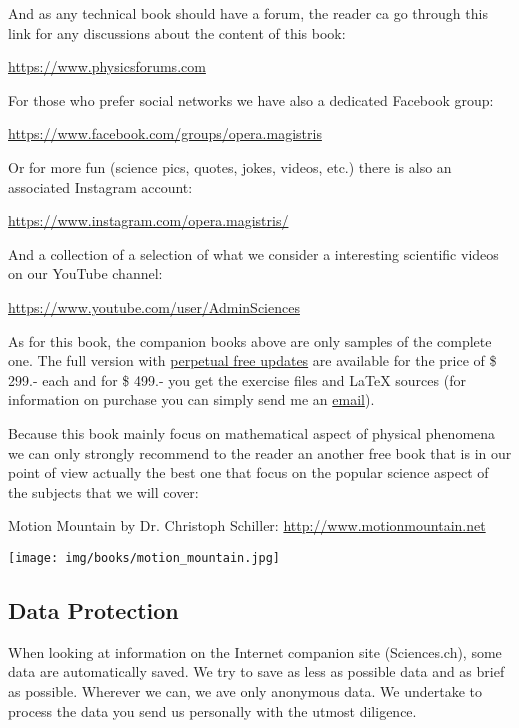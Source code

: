 	And as any technical book should have a forum, the reader ca go through this link for any discussions about the content of this book:
	\begin{center}
		\url{https://www.physicsforums.com}
	\end{center}
	For those who prefer social networks we have also a dedicated  Facebook group:
	\begin{center}
		\faFacebook{} \href{https://www.facebook.com/groups/1793543747588689/}{https://www.facebook.com/groups/opera.magistris}
	\end{center}
	Or for more fun (science pics, quotes, jokes, videos, etc.) there is also an associated Instagram account:
	\begin{center}
		\faInstagram{} \href{https://www.instagram.com/opera.magistris/}{https://www.instagram.com/opera.magistris/}
	\end{center}
	And a collection of a selection of what we consider a interesting scientific videos on our YouTube channel:
	\begin{center}
		\faYoutube{} \href{https://www.youtube.com/user/AdminSciences}{https://www.youtube.com/user/AdminSciences}
	\end{center}

	As for this book, the companion books above are only samples of the complete one. The full version with \underline{perpetual free updates} are available for the price of \$ 299.- each and for \$ 499.- you get the exercise files and \LaTeX{} sources (for information on purchase you can simply send me an {\href{mailto:isoz@sciences.ch}{{\color{blue}email}}}).

	Because this book mainly focus on mathematical aspect of physical phenomena we can only strongly recommend to the reader an another free book that is in our point of view actually the best one that focus on the popular science aspect of the subjects that we will cover:
	\begin{center}
	Motion Mountain by Dr. Christoph Schiller: \url{http://www.motionmountain.net}
	\end{center}
	\begin{center}
		\texttt{[image: img/books/motion\_mountain.jpg]}
	\end{center}

	\pagebreak
	\subsection{Data Protection}
	When looking at information on the Internet companion site (Sciences.ch), some data are automatically saved. We try to save as less as possible data and as brief as possible. Wherever we can, we ave only anonymous data. We undertake to process the data you send us personally with the utmost diligence.

